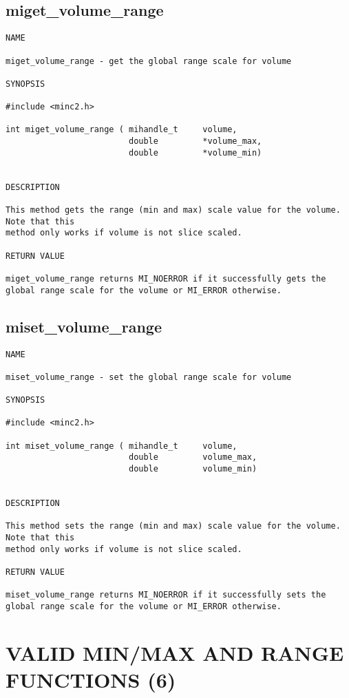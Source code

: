 \documentclass{article}
\begin{document}
\subsection{miget\_volume\_range}
\begin{verbatim}
NAME

miget_volume_range - get the global range scale for volume

SYNOPSIS

#include <minc2.h>

int miget_volume_range ( mihandle_t     volume,
                         double         *volume_max,
                         double         *volume_min)


DESCRIPTION

This method gets the range (min and max) scale value for the volume. Note that this 
method only works if volume is not slice scaled.

RETURN VALUE

miget_volume_range returns MI_NOERROR if it successfully gets the
global range scale for the volume or MI_ERROR otherwise. 
\end{verbatim}

\subsection{miset\_volume\_range}
\begin{verbatim}
NAME

miset_volume_range - set the global range scale for volume

SYNOPSIS

#include <minc2.h>

int miset_volume_range ( mihandle_t     volume,
                         double         volume_max,
                         double         volume_min)


DESCRIPTION

This method sets the range (min and max) scale value for the volume. Note that this 
method only works if volume is not slice scaled.

RETURN VALUE

miset_volume_range returns MI_NOERROR if it successfully sets the
global range scale for the volume or MI_ERROR otherwise.
\end{verbatim}

\section{VALID MIN/MAX AND RANGE FUNCTIONS (6)}
\end{document}
